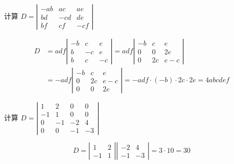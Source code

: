 \begin{frame}
  
    \begin{li}[2008－2009第一学期]
      计算
      $
      D=\left|
      \begin{array}{rrr}
        -ab&ac&ae\\
        bd&-cd&de\\
        bf&cf&-cf
      \end{array}
      \right|
      $
    \end{li}
    \pause

    \begin{jie}
    $$
    \begin{array}{rl}
    D&=adf\left|
      \begin{array}{rrr}
        -b&c&e\\
        b&-c&e\\
        b&c&-c
      \end{array}
      \right|=adf\left|
      \begin{array}{rrr}
        -b&c&e\\
        0&0&2e\\
        0&2c&e-c
      \end{array}
      \right|\\[0.2in]
      &=-adf\left|
      \begin{array}{rrr}
        -b&c&e\\
        0&2c&e-c\\
        0&0&2e
      \end{array}
      \right|  
      =-adf\cdot(-b)\cdot 2c \cdot 2e=4abcdef
    \end{array}
    $$
    \end{jie}
\end{frame}




\begin{frame}
  
    \begin{li}[2012－2013第二学期]
      计算
      $
      D=\left|
      \begin{array}{rrrr}
        1&2&0&0\\
        -1&1&0&0\\
        0&-1&-2&4\\
        0&0&-1&-3
      \end{array}
      \right|
      $
    \end{li}
    \pause

    \begin{jie}
    $$
    D=\left|
    \begin{array}{rr}
      1&2\\
      -1&1
    \end{array}
    \right|\left|
    \begin{array}{rr}
      -2&4\\
      -1&-3
    \end{array}
    \right|=3\cdot10=30
    $$
    \end{jie}
\end{frame}



